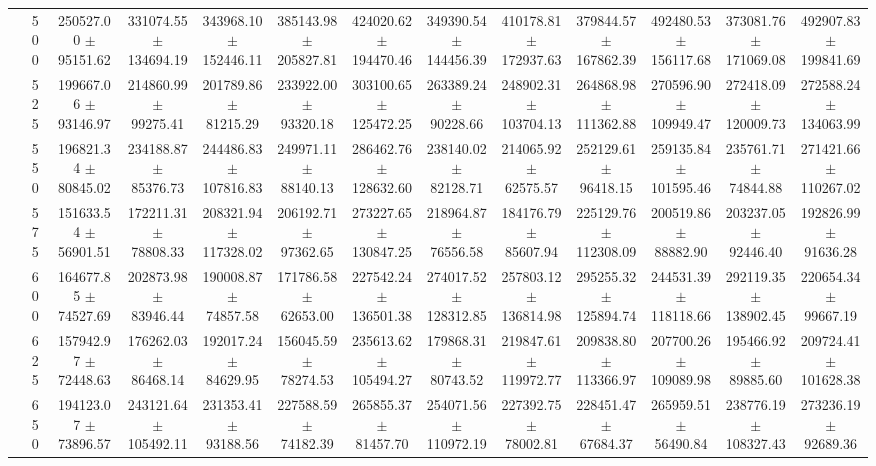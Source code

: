 \begin{table}[h]
{\begin{tabular}{
        ccccccccccccc}
 & 500& 250527.00 $\pm$ 95151.62& 331074.55 $\pm$ 134694.19& 343968.10 $\pm$ 152446.11& 385143.98 $\pm$ 205827.81& 424020.62 $\pm$ 194470.46& 349390.54 $\pm$ 144456.39& 410178.81 $\pm$ 172937.63& 379844.57 $\pm$ 167862.39& 492480.53 $\pm$ 156117.68& 373081.76 $\pm$ 171069.08& 492907.83 $\pm$ 199841.69 \\ 
 & 525& 199667.06 $\pm$ 93146.97& 214860.99 $\pm$ 99275.41& 201789.86 $\pm$ 81215.29& 233922.00 $\pm$ 93320.18& 303100.65 $\pm$ 125472.25& 263389.24 $\pm$ 90228.66& 248902.31 $\pm$ 103704.13& 264868.98 $\pm$ 111362.88& 270596.90 $\pm$ 109949.47& 272418.09 $\pm$ 120009.73& 272588.24 $\pm$ 134063.99 \\ 
 & 550& 196821.34 $\pm$ 80845.02& 234188.87 $\pm$ 85376.73& 244486.83 $\pm$ 107816.83& 249971.11 $\pm$ 88140.13& 286462.76 $\pm$ 128632.60& 238140.02 $\pm$ 82128.71& 214065.92 $\pm$ 62575.57& 252129.61 $\pm$ 96418.15& 259135.84 $\pm$ 101595.46& 235761.71 $\pm$ 74844.88& 271421.66 $\pm$ 110267.02 \\ 
 & 575& 151633.54 $\pm$ 56901.51& 172211.31 $\pm$ 78808.33& 208321.94 $\pm$ 117328.02& 206192.71 $\pm$ 97362.65& 273227.65 $\pm$ 130847.25& 218964.87 $\pm$ 76556.58& 184176.79 $\pm$ 85607.94& 225129.76 $\pm$ 112308.09& 200519.86 $\pm$ 88882.90& 203237.05 $\pm$ 92446.40& 192826.99 $\pm$ 91636.28 \\ 
 & 600& 164677.85 $\pm$ 74527.69& 202873.98 $\pm$ 83946.44& 190008.87 $\pm$ 74857.58& 171786.58 $\pm$ 62653.00& 227542.24 $\pm$ 136501.38& 274017.52 $\pm$ 128312.85& 257803.12 $\pm$ 136814.98& 295255.32 $\pm$ 125894.74& 244531.39 $\pm$ 118118.66& 292119.35 $\pm$ 138902.45& 220654.34 $\pm$ 99667.19 \\ 
 & 625& 157942.97 $\pm$ 72448.63& 176262.03 $\pm$ 86468.14& 192017.24 $\pm$ 84629.95& 156045.59 $\pm$ 78274.53& 235613.62 $\pm$ 105494.27& 179868.31 $\pm$ 80743.52& 219847.61 $\pm$ 119972.77& 209838.80 $\pm$ 113366.97& 207700.26 $\pm$ 109089.98& 195466.92 $\pm$ 89885.60& 209724.41 $\pm$ 101628.38 \\ 
 & 650& 194123.07 $\pm$ 73896.57& 243121.64 $\pm$ 105492.11& 231353.41 $\pm$ 93188.56& 227588.59 $\pm$ 74182.39& 265855.37 $\pm$ 81457.70& 254071.56 $\pm$ 110972.19& 227392.75 $\pm$ 78002.81& 228451.47 $\pm$ 67684.37& 265959.51 $\pm$ 56490.84& 238776.19 $\pm$ 108327.43& 273236.19 $\pm$ 92689.36 \\ \hline 

        \end{tabular}%
        }

        \end{table}
        
